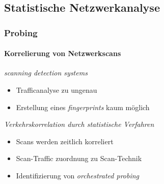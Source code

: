 
\subsection{Statistische Netzwerkanalyse}
\begin{frame}
\frametitle{Probing}
\framesubtitle{Korrelierung von Netzwerkscans}

\begin{alertblock}{\textit{scanning detection systems}}
    \begin{itemize}
        \item Trafficanalyse zu ungenau
        \item Erstellung eines \textit{fingerprints} kaum möglich
    \end{itemize}
\end{alertblock}
\vspace{0.6cm}
\begin{exampleblock}{\textit{Verkehrskorrelation durch statistische Verfahren}}
    \begin{itemize}
        \item Scans werden zeitlich korreliert
        \item Scan-Traffic zuordnung zu Scan-Technik
        \item Identifizierung von \textit{orchestrated probing}
    \end{itemize}
\end{exampleblock}

\end{frame}
